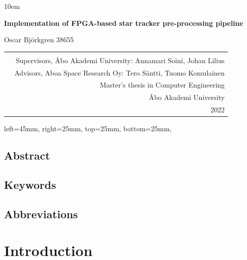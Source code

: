 \documentclass[12pt]{report}
\begin{document}
\emergencystretch 10em
\begin{titlepage}
\begin{center}
        \vspace*{5cm}
        
        \LARGE
        \textbf{Implementation of FPGA-based star tracker pre-processing pipeline}
        \\
        \vspace{0.5cm}
        
        Oscar Björkgren 38655
        
\end{center}
\vspace{8cm}
\begin{tabular}{l r }
\multirow{4}{10em}{
} \\
\multirow{12}{1em}{
} &

Supervisors, Åbo Akademi University: Annamari Soini, Johan Lilius\\ &
Advisors, Aboa Space Research Oy: Tero Säntti, Tuomo Komulainen\\ & 
Master's thesis in Computer Engineering\\ &
Åbo Akademi University\\ &
2022

\end{tabular}

\flushright
\end{titlepage}
\newgeometry
{
 left=45mm,
 right=25mm,
 top=25mm,
 bottom=25mm,
}
\section*{Abstract}
\section*{Keywords}
\section*{Abbreviations}

\tableofcontents
\listoffigures
\listoftables

\chapter{Introduction}
\end{document}
